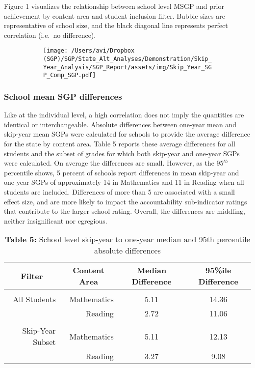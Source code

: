\documentclass[12pt]{article}
\begin{document}
Figure 1 visualizes the relationship between school level MSGP and prior
achievement by content area and student inclusion filter. Bubble sizes
are representative of school size, and the black diagonal line
represents perfect correlation (i.e.~no difference).

\begin{figure}[H]
\caption*{{{\bf{Figure 1:}} } Sequential- and skip-year mean SGP by content area and student filter}
  \begin{subfigure}[b]{1\textwidth}
    \texttt{[image: /Users/avi/Dropbox (SGP)/SGP/State\_Alt\_Analyses/Demonstration/Skip\_Year\_Analysis/SGP\_Report/assets/img/Skip\_Year\_SGP\_Comp\_SGP.pdf]}
  \end{subfigure}
\end{figure}

\pagebreak

\hypertarget{school-mean-sgp-differences}{%
\subsubsection{School mean SGP
differences}\label{school-mean-sgp-differences}}

Like at the individual level, a high correlation does not imply the
quantities are identical or interchangeable. Absolute differences
between one-year mean and skip-year mean SGPs were calculated for
schools to provide the average difference for the state by content area.
Table 5 reports these average differences for all students and the
subset of grades for which both skip-year and one-year SGPs were
calculated. On average the differences are small. However, as the
95\(^{th}\) percentile shows, 5 percent of schools report differences in
mean skip-year and one-year SGPs of approximately 14 in Mathematics and
11 in Reading when all students are included. Differences of more than 5
are associated with a small effect size, and are more likely to impact
the accountability sub-indicator ratings that contribute to the larger
school rating. Overall, the differences are middling, neither
insignificant nor egregious.

\begin{table}[H]
\caption*{\textbf{Table 5:} School level skip-year to one-year median and 95th percentile absolute differences\label{table5}} 
\begin{center}
\begin{tabular}{rrcc}
\hline\hline
\multicolumn{1}{c}{Filter}&\multicolumn{1}{c}{Content Area}&\multicolumn{1}{c}{Median Difference}&\multicolumn{1}{c}{95\%ile Difference}\tabularnewline
\hline
&&&\tabularnewline
All Students&Mathematics&5.11&14.36\tabularnewline
&Reading&2.72&11.06\tabularnewline
\hline
&&&\tabularnewline
Skip-Year Subset&Mathematics&5.11&12.13\tabularnewline
&Reading&3.27& 9.08\tabularnewline
\hline
\end{tabular}\end{center}
\end{table}
\end{document}

